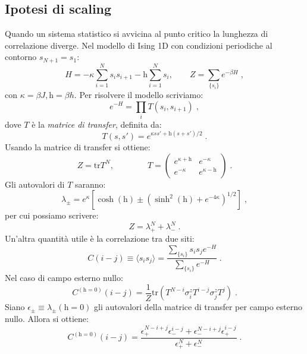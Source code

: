 \documentclass[12pt,a4paper]{article}
\theoremstyle{definition}
\numberwithin{equation}{section}
\newcommand{\bra}{\langle}
\newcommand{\ket}{\rangle}
\newcommand{\tr}{\mathrm{tr}}
\begin{document}
\subsection{Ipotesi di scaling}
Quando un sistema statistico si avvicina al punto critico la lunghezza di correlazione  diverge. Nel modello di Ising 1D con condizioni periodiche al contorno $s_{N+1}=s_1$:
\begin{equation}
H=-\kappa\sum_{i=1}^Ns_is_{i+1}-\mathrm{h}\sum_{i=1}^Ns_i,\qquad Z=\sum_{\{s_i\}}e^{-\beta H}\;,
\end{equation}
con $\kappa=\beta J, \mathrm{h}=\beta h$. Per risolvere il modello scriviamo:
\begin{equation}
e^{-H}=\prod_i T(s_i,s_{i+1})\;,
\end{equation}
dove $T$ è la \emph{matrice di transfer}, definita da:
\begin{equation}
T(s,s')=e^{\kappa ss'+\mathrm{h}(s+s')/2}\;.
\end{equation}
Usando la matrice di transfer si ottiene:
\begin{equation}
Z=\tr T^N,\qquad\qquad T=\left(\begin{matrix}
e^{\kappa+\mathrm{h}} & e^{-\kappa} \\
e^{-\kappa} & e^{\kappa-\mathrm{h}}
\end{matrix}\right)\;.
\end{equation}
Gli autovalori di $T$ saranno:
\begin{equation}
\lambda_{\pm}=e^{\kappa}\left[\cosh(\mathrm{h})\pm(\sinh^2(\mathrm{h})+e^{-4\kappa})^{1/2}\right]\;,
\end{equation}
per cui possiamo scrivere:
\begin{equation}
Z=\lambda_+^N+\lambda_-^N\;.
\end{equation}
Un'altra quantità utile è la correlazione tra due siti:
\begin{equation}
C(i-j)\equiv \bra s_is_j\ket=\frac{\sum_{\{s_i\}}s_is_je^{-H}}{\sum_{\{s_i\}}e^{-H}}\;.
\end{equation}
Nel caso di campo esterno nullo:
\begin{equation}
C^{(\mathrm{h}=0)}(i-j)=\frac{1}{Z}\tr\left(T^{N-i}\sigma_i^zT^{i-j}\sigma_j^zT^j\right)\;.
\end{equation}
Siano $\epsilon_{\pm}\equiv\lambda_{\pm}(\mathrm{h}=0)$ gli autovalori della matrice di transfer per campo esterno nullo. Allora si ottiene:
\begin{equation}
C^{(\mathrm{h=0})}(i-j)=\frac{\epsilon_+^{N-i+j}\epsilon_-^{i-j}+\epsilon_-^{N-i+j}\epsilon_+^{i-j}}{\epsilon_+^N+\epsilon_-^N}\;.
\end{equation}
\end{document}

